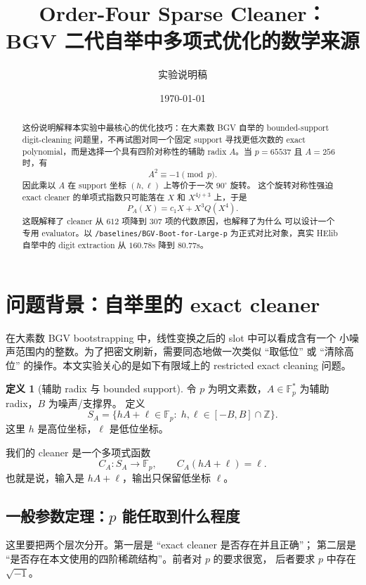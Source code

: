 \documentclass[11pt,a4paper]{ctexart}
\title{\bfseries Order-Four Sparse Cleaner：\\
BGV 二代自举中多项式优化的数学来源}
\author{实验说明稿}
\date{\today}
\newcommand{\Fp}{\mathbb{F}_p}
\newcommand{\ZZ}{\mathbb{Z}}
\theoremstyle{definition}
\newtheorem{definition}{定义}
\begin{document}
\maketitle

\begin{abstract}
这份说明解释本实验中最核心的优化技巧：在大素数 BGV 自举的
bounded-support digit-cleaning 问题里，不再试图对同一个固定 support
寻找更低次数的 exact polynomial，而是选择一个具有四阶对称性的辅助 radix
$A$。当 $p=65537$ 且 $A=256$ 时，有
\[
  A^2 \equiv -1 \pmod p.
\]
因此乘以 $A$ 在 support 坐标 $(h,\ell)$ 上等价于一次 $90^\circ$ 旋转。
这个旋转对称性强迫 exact cleaner 的单项式指数只可能落在
$X$ 和 $X^{4j+3}$ 上，于是
\[
  P_A(X)=c_1X+X^3Q(X^4).
\]
这既解释了 cleaner 从 $612$ 项降到 $307$ 项的代数原因，也解释了为什么
可以设计一个专用 evaluator。以 \texttt{/baselines/BGV-Boot-for-Large-p}
为正式对比对象，真实 HElib 自举中的 digit extraction 从 $160.78$s
降到 $80.77$s。
\end{abstract}

\tableofcontents

\section{问题背景：自举里的 exact cleaner}

在大素数 BGV bootstrapping 中，线性变换之后的 slot 中可以看成含有一个
小噪声范围内的整数。为了把密文刷新，需要同态地做一次类似
``取低位'' 或 ``清除高位'' 的操作。本文实验关心的是如下有限域上的
restricted exact cleaning 问题。

\begin{definition}[辅助 radix 与 bounded support]
令 $p$ 为明文素数，$A\in \Fp^\ast$ 为辅助 radix，$B$ 为噪声/支撑界。
定义
\[
  S_A=\{hA+\ell \in \Fp:\; h,\ell\in[-B,B]\cap\ZZ\}.
\]
这里 $h$ 是高位坐标，$\ell$ 是低位坐标。
\end{definition}

我们的 cleaner 是一个多项式函数
\[
  C_A:S_A\to \Fp,\qquad C_A(hA+\ell)=\ell.
\]
也就是说，输入是 $hA+\ell$，输出只保留低坐标 $\ell$。

\subsection{一般参数定理：$p$ 能任取到什么程度}

这里要把两个层次分开。第一层是 ``exact cleaner 是否存在并且正确''；
第二层是 ``是否存在本文使用的四阶稀疏结构''。前者对 $p$ 的要求很宽，
后者要求 $p$ 中存在 $\sqrt{-1}$。
\end{document}
